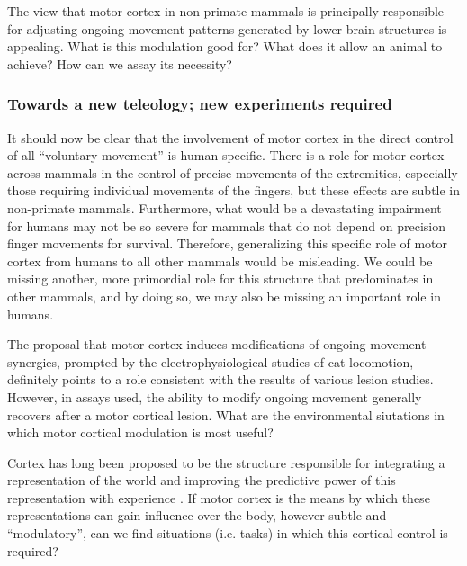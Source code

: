 The view that motor cortex in non-primate mammals is principally responsible for adjusting ongoing movement patterns generated by lower brain structures is appealing. What is this modulation good for? What does it allow an animal to achieve? How can we assay its necessity?

\subsubsection*{Towards a new teleology; new experiments required}

It should now be clear that the involvement of motor cortex in the direct control of all ``voluntary movement'' is human-specific. There is a role for motor cortex across mammals in the control of precise movements of the extremities, especially those requiring individual movements of the fingers, but these effects are subtle in non-primate mammals. Furthermore, what would be a devastating impairment for humans may not be so severe for mammals that do not depend on precision finger movements for survival. Therefore, generalizing this specific role of motor cortex from humans to all other mammals would be misleading. We could be missing another, more primordial role for this structure that predominates in other mammals, and by doing so, we may also be missing an important role in humans.

The proposal that motor cortex induces modifications of ongoing movement synergies, prompted by the electrophysiological studies of cat locomotion, definitely points to a role consistent with the results of various lesion studies. However, in assays used, the ability to modify ongoing movement generally recovers after a motor cortical lesion. What are the environmental siutations in which motor cortical modulation is most useful?

Cortex has long been proposed to be the structure responsible for integrating a representation of the world and improving the predictive power of this representation with experience \cite{Barlow1985,Doya1999}. If motor cortex is the means by which these representations can gain influence over the body, however subtle and ``modulatory'', can we find situations (i.e. tasks) in which this cortical control is required?

